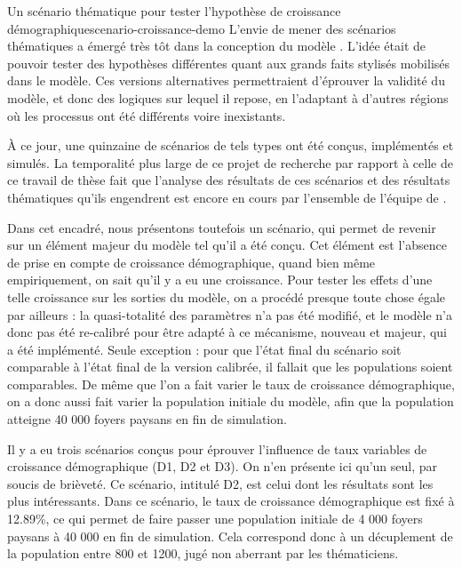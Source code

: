 \begin{encadre}{Un scénario thématique pour tester l'hypothèse de croissance démographique}{scenario-croissance-demo}
	\renewcommand{\thempfootnote}{\alph{mpfootnote}}	
L'envie de mener des \og scénarios thématiques\fg{} a émergé très tôt dans la conception du modèle \simfeodal{}.
L'idée était de pouvoir tester des hypothèses différentes quant aux grands faits stylisés mobilisés dans le modèle.
Ces versions alternatives permettraient d'éprouver la validité du modèle, et donc des logiques sur lequel il repose, en l'adaptant à d'autres régions où les processus ont été différents voire inexistants.

\vspace*{1em} À ce jour, une quinzaine de scénarios de tels types ont été conçus, implémentés et simulés.
La temporalité plus large de ce projet de recherche par rapport à celle de ce travail de thèse fait que l'analyse des résultats de ces scénarios et des résultats thématiques qu'ils engendrent est encore en cours par l'ensemble de l'équipe de \simfeodal{}.

\vspace*{1em} Dans cet encadré, nous présentons toutefois un scénario, qui permet de revenir sur un élément majeur du modèle tel qu'il a été conçu.
Cet élément est l'absence de prise en compte de croissance démographique, quand bien même empiriquement, on sait qu'il y a eu une croissance.
Pour tester les effets d'une telle croissance sur les sorties du modèle, on a procédé presque toute chose égale par ailleurs : la quasi-totalité des paramètres n'a pas été modifié, et le modèle n'a donc pas été re-calibré pour être adapté à ce mécanisme, nouveau et majeur, qui a été implémenté.
Seule exception : pour que l'état final du scénario soit comparable à l'état final de la version calibrée, il fallait que les populations soient comparables.
De même que l'on a fait varier le taux de croissance démographique, on a donc aussi fait varier la population initiale du modèle, afin que la population atteigne 40 000 foyers paysans en fin de simulation.

\vspace*{1em} Il y a eu trois scénarios conçus pour éprouver l'influence de taux variables de croissance démographique (D1, D2 et D3).
On n'en présente ici qu'un seul, par soucis de brièveté.
Ce scénario, intitulé \og D2\fg{}, est celui dont les résultats sont les plus intéressants.
Dans ce scénario, le taux de croissance démographique est fixé à 12.89\%, ce qui permet de faire passer une population initiale de 4 000 foyers paysans à 40 000 en fin de simulation.
Cela correspond donc à un décuplement de la population entre 800 et 1200, jugé non aberrant par les thématiciens.


\end{encadre}
